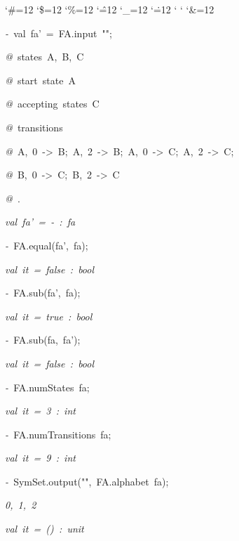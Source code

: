 \begin{list}{}
{\setlength{\leftmargin}{\leftmargini}
\setlength{\rightmargin}{0cm}
\setlength{\itemindent}{0cm}
\setlength{\listparindent}{0cm}
\setlength{\itemsep}{0cm}
\setlength{\parsep}{0cm}
\setlength{\labelsep}{0cm}
\setlength{\labelwidth}{0cm}
\catcode`\#=12
\catcode`\$=12
\catcode`\%=12
\catcode`\^=12
\catcode`\_=12
\catcode`\.=12
\catcode`
\catcode`
\catcode`\&=12
\ttfamily}
\small
\item[]\textsl{-\ }val\ fa'\ =\ FA.input\ "";
\item[]\textsl{@\ }states\ A,\ B,\ C
\item[]\textsl{@\ }start\ state\ A
\item[]\textsl{@\ }accepting\ states\ C
\item[]\textsl{@\ }transitions
\item[]\textsl{@\ }A,\ 0\ ->\ B;\ A,\ 2\ ->\ B;\ A,\ 0\ ->\ C;\ A,\ 2\ ->\ C;
\item[]\textsl{@\ }B,\ 0\ ->\ C;\ B,\ 2\ ->\ C
\item[]\textsl{@\ }.
\item[]\textsl{val\ fa'\ =\ -\ :\ fa}
\item[]\textsl{-\ }FA.equal(fa',\ fa);
\item[]\textsl{val\ it\ =\ false\ :\ bool}
\item[]\textsl{-\ }FA.sub(fa',\ fa);
\item[]\textsl{val\ it\ =\ true\ :\ bool}
\item[]\textsl{-\ }FA.sub(fa,\ fa');
\item[]\textsl{val\ it\ =\ false\ :\ bool}
\item[]\textsl{-\ }FA.numStates\ fa;
\item[]\textsl{val\ it\ =\ 3\ :\ int}
\item[]\textsl{-\ }FA.numTransitions\ fa;
\item[]\textsl{val\ it\ =\ 9\ :\ int}
\item[]\textsl{-\ }SymSet.output("",\ FA.alphabet\ fa);
\item[]\textsl{0,\ 1,\ 2}
\item[]\textsl{val\ it\ =\ ()\ :\ unit}
\end{list}

